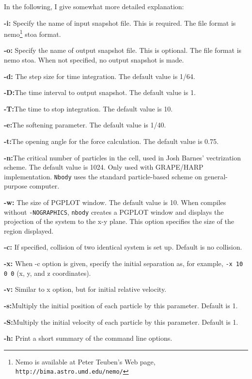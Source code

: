 In the following, I give somewhat more detailed explanation:
\begin{description}
\item{\bf -i:} Specify the name of input snapshot file. This is 
required. The file format is nemo\footnote{Nemo is available at
Peter Teuben's Web page, {\tt
http://bima.astro.umd.edu/nemo/}}
stoa format. 
\item{\bf -o:} Specify the name of output snapshot file. This  is 
optional. The file format is nemo stoa. When not specified, no output
snapshot is made.
\item{\bf -d:} The step size for time integration. The default value
is 1/64.

\item{\bf -D:}The time interval to output snapshot. The default value
is 1. 

\item{\bf -T:}The time to stop integration. The default value is 10.

\item{\bf -e:}The softening parameter.  The default value
is 1/40. 

\item{\bf -t:}The opening angle for the force calculation.  The default value
is 0.75. 

\item{\bf -n:}The critical number of particles in the cell, used in
Josh Barnes' vectrization scheme.  The default value is 1024.  Only
used with GRAPE/HARP implementation. {\tt Nbody} uses the standard
particle-based scheme on general-purpose computer. 

\item{\bf -w:} The size of PGPLOT window. The default value is
10. When compiles without {\tt -NOGRAPHICS}, {\tt nbody} creates a
PGPLOT window and displays the projection of the system to the x-y
plane. This option specifies the size of the region displayed.

\item{\bf -c:} If specified, collision of two identical system is set
up. Default is no collision.

\item{\bf -x:} When -c option is given, specify the initial separation 
as, for example,  {\tt -x 10 0 0} (x, y, and z coordinates). 
\item{\bf -v:} Similar to x option, but for initial relative
velocity. 

\item{\bf -s:}Multiply the initial position  of each particle by this parameter. Default 
is 1. 
\item{\bf -S:}Multiply the initial velocity of each particle  by this parameter. Default 
is 1. 

\item{\bf -h:} Print a short summary of the command line options.

\end{description}

